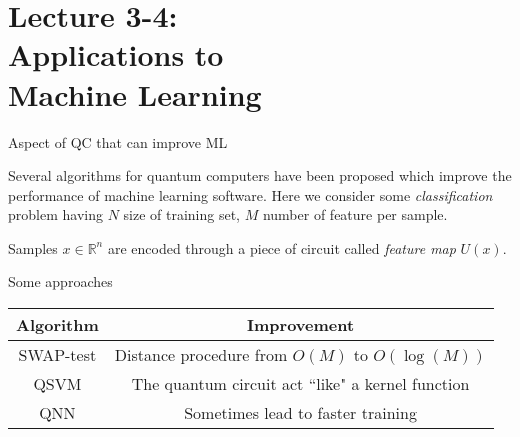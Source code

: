 \section{Lecture 3-4:\\ Applications to\\ Machine Learning}
\SectionPage{}

\begin{frame}{Aspect of QC that can improve ML}

Several algorithms for quantum computers have been proposed which improve the performance of machine learning software. Here we consider some \emph{classification} problem having \(N\) size of training set, \(M\) number of feature per sample. \bigskip

Samples $x \in \mathbb{R}^n$ are encoded through a piece of circuit called \emph{feature map} $U(x)$.

\end{frame}


\begin{frame}{Some approaches}
\begin{center}
\begin{tabular}{c c}
    Algorithm & Improvement \\ \midrule
    SWAP-test & Distance procedure from \(O(M)\) to \(O(\log(M))\)  \\[1em]
    QSVM & The quantum circuit act ``like" a kernel function  \\[1em]
    QNN & Sometimes lead to faster training  \\[1em]
\end{tabular}
\end{center}
\end{frame}





